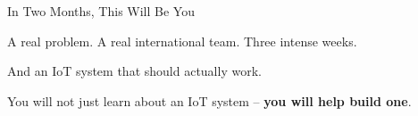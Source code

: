 \begin{frame}
\centering
\vfill
{\color{fh-ooe-red}\Huge In Two Months, This Will Be You\par}
\vspace{1.5em}
{\Large A real problem. A real international team. Three intense weeks.\par}
\vspace{0.8em}
{\Large And an IoT system that should actually work.\par}
\vfill
{\large You will not just learn about an IoT system -- \textbf{you will help build one}.\par}
\vfill
\end{frame}

